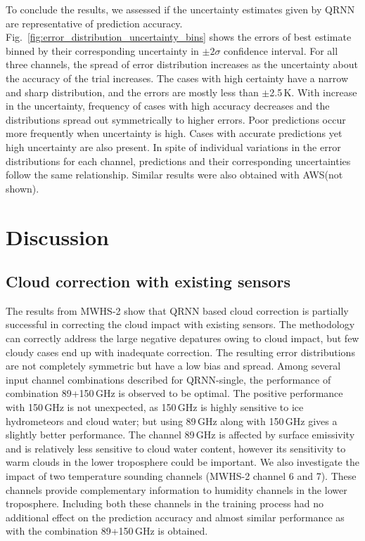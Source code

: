\documentclass[amt, manuscript]{copernicus}
\begin{document}
To conclude the results, we assessed if the uncertainty estimates given by QRNN are representative of prediction accuracy. Fig.~\ref{fig:error_distribution_uncertainty_bins} shows the errors of best estimate binned by their corresponding uncertainty in $\pm2\sigma$  confidence interval. For all three channels, the spread of error distribution increases as the uncertainty about the accuracy of the trial increases. The cases with high certainty have a narrow and sharp distribution, and the errors are mostly less than $\pm$2.5\,K. With increase in the uncertainty, frequency of cases with high accuracy decreases and the distributions spread out symmetrically to higher errors. Poor predictions occur more frequently when uncertainty is high. Cases with accurate predictions yet high uncertainty are also present. In spite of individual variations in the error distributions for each channel, predictions and their corresponding uncertainties follow the same relationship. Similar results were also obtained with AWS(not shown). 


\section{Discussion}
\label{discussions}

\subsection{Cloud correction with existing sensors}
%
The results from MWHS-2 show that QRNN based cloud correction is partially successful in correcting the cloud impact with existing sensors. The methodology can correctly address the large negative depatures owing to cloud impact, but few cloudy cases end up with inadequate correction. The resulting error distributions are not completely symmetric but have a low bias and spread. Among several input channel combinations described for QRNN-single, the performance of combination 89+150\,GHz is observed to be optimal. The positive performance with 150\,GHz is not unexpected, as 150\,GHz is highly sensitive to ice hydrometeors and cloud water; but using 89\,GHz along with 150\,GHz gives a slightly better performance. The channel 89\,GHz is affected by surface emissivity and is relatively less sensitive to cloud water content, however its sensitivity to warm clouds in the lower troposphere could be important. We also investigate the impact of two temperature sounding channels (MWHS-2 channel 6 and 7). These channels provide complementary information to humidity channels in the lower troposphere. Including both these channels in the training process had no additional effect on the prediction accuracy and almost similar performance as with the combination 89+150\,GHz is obtained. 
\end{document}
